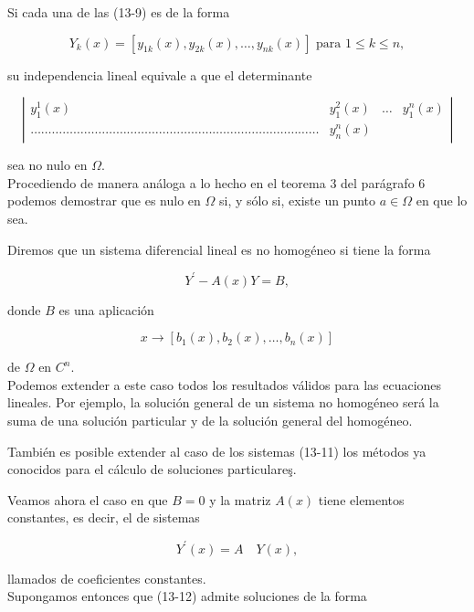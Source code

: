 \documentclass[10pt]{article}
\theoremstyle{plain}
\theoremstyle{definition}
\theoremstyle{remark}
\begin{document}
Si cada una de las (13-9) es de la forma

$$
Y_{k}(x)=\left[y_{1 k}(x), y_{2 k}(x), \ldots, y_{n k}(x)\right] \text { para } 1 \leqslant k \leqslant n,
$$

su independencia lineal equivale a que el determinante

\[
\left|\begin{array}{cccc}
y_{1}^{1}(x) & y_{1}^{2}(x) & \ldots & y_{1}^{n}(x)  \tag{13-10}\\
\ldots \ldots \ldots \ldots \ldots \ldots \ldots \ldots \ldots \ldots \ldots \ldots \ldots \ldots \ldots \ldots \ldots \ldots \ldots \ldots \ldots \ldots \ldots \ldots \ldots \ldots \ldots & y_{n}^{n}(x)
\end{array}\right|
\]

sea no nulo en $\Omega$.\\
Procediendo de manera análoga a lo hecho en el teorema 3 del parágrafo 6 podemos demostrar que es nulo en $\Omega$ si, y sólo si, existe un punto $a \in \Omega$ en que lo sea.

Diremos que un sistema diferencial lineal es no homogéneo si tiene la forma


\begin{equation*}
Y^{\prime}-A(x) Y=B, \tag{13-11}
\end{equation*}


donde $B$ es una aplicación

$$
x \rightarrow\left[b_{1}(x), b_{2}(x), \ldots, b_{n}(x)\right]
$$

de $\Omega$ en $C^{n}$.\\
Podemos extender a este caso todos los resultados válidos para las ecuaciones lineales. Por ejemplo, la solución general de un sistema no homogéneo será la suma de una solución particular y de la solución general del homogéneo.

También es posible extender al caso de los sistemas (13-11) los métodos ya conocidos para el cálculo de soluciones particulareş.

Veamos ahora el caso en que $B=0$ y la matriz $A(x)$ tiene elementos constantes, es decir, el de sistemas


\begin{equation*}
Y^{\prime}(x)=A \quad Y(x), \tag{13-12}
\end{equation*}


llamados de coeficientes constantes.\\
Supongamos entonces que (13-12) admite soluciones de la forma
\end{document}
